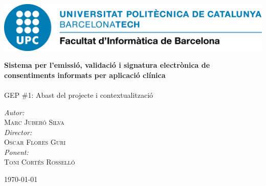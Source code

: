\begin{titlepage}
\center

\includegraphics[scale=0.4]{img/UPC-FIB.png}
\vspace{2cm}


{\huge \bfseries Sistema per l'emissió, validació i signatura electrònica de consentiments informats per aplicació clínica}\\[0.4cm]
\HRule \\[0.2cm]


\Large GEP \#1: Abast del projecte i contextualització

\vspace{8cm}

\emph{Autor:}\\ \large
 \textsc{Marc Juberó Silva}\\
\vspace{0.5cm}
\emph{Director:}\\ \large
 \textsc{Oscar Flores Guri}\\
\vspace{0.5cm}
\emph{Ponent:}\\ \large
 \textsc{Toni Cortés Rosselló}\\

\vspace{1cm}


{\large \today}\\[1cm] %

\vfill
\end{titlepage}